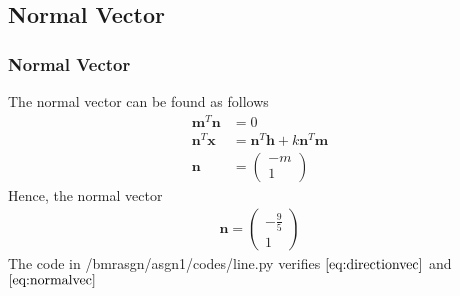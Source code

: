 \documentclass{beamer}
\theoremstyle{remark}
\newcommand{\myvec}[1]{\ensuremath{\begin{pmatrix}#1\end{pmatrix}}} %
\let\vec\mathbf %
\numberwithin{equation}{section}
\begin{document}
\subsection{Normal Vector}
\begin{frame}
\frametitle{Normal Vector}
The normal vector can be found as follows \\
        \begin{align}
            \vec{m}^T\vec{n} &= 0 \\
            \vec{n}^T\vec{x} &= \vec{n}^T\vec{h} + k\vec{n}^T\vec{m} \\
            \vec{n} &= \myvec{-m \\ 1}
        \end{align}
Hence, the normal vector \\ 
        \begin{align}
        \label{eq:normalvec}
            \vec{n} = \myvec{-\frac{9}{5} \\ 1}
        \end{align}
The code in /bmrasgn/asgn1/codes/line.py verifies $\eqref{eq:directionvec}$ and $\eqref{eq:normalvec}$
\end{frame}
\end{document}
